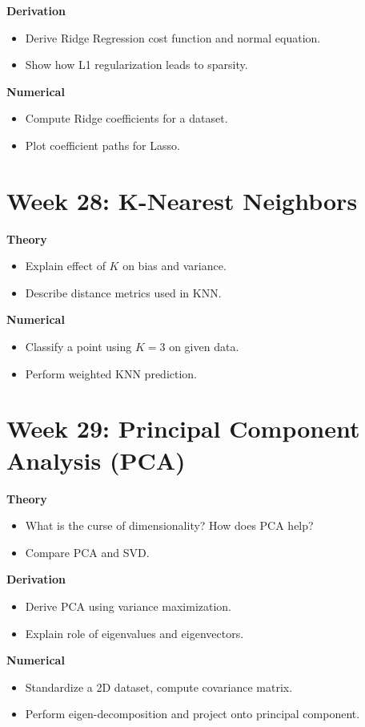 \documentclass[12pt]{article}
\begin{document}
\textbf{Derivation}
\begin{itemize}
\item Derive Ridge Regression cost function and normal equation.
\item Show how L1 regularization leads to sparsity.
\end{itemize}

\textbf{Numerical}
\begin{itemize}
\item Compute Ridge coefficients for a dataset.
\item Plot coefficient paths for Lasso.
\end{itemize}

\section*{Week 28: K-Nearest Neighbors}
\textbf{Theory}
\begin{itemize}
\item Explain effect of $K$ on bias and variance.
\item Describe distance metrics used in KNN.
\end{itemize}

\textbf{Numerical}
\begin{itemize}
\item Classify a point using $K=3$ on given data.
\item Perform weighted KNN prediction.
\end{itemize}

\section*{Week 29: Principal Component Analysis (PCA)}
\textbf{Theory}
\begin{itemize}
\item What is the curse of dimensionality? How does PCA help?
\item Compare PCA and SVD.
\end{itemize}

\textbf{Derivation}
\begin{itemize}
\item Derive PCA using variance maximization.
\item Explain role of eigenvalues and eigenvectors.
\end{itemize}

\textbf{Numerical}
\begin{itemize}
\item Standardize a 2D dataset, compute covariance matrix.
\item Perform eigen-decomposition and project onto principal component.
\end{itemize}
\end{document}
